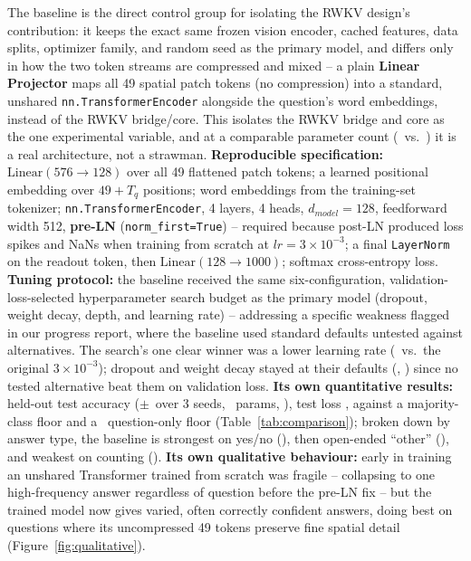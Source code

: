 \documentclass[final]{article}
\begin{document}
The baseline is the direct control group for isolating the RWKV design's contribution: it keeps
the exact same frozen vision encoder, cached features, data splits, optimizer family, and random
seed as the primary model, and differs only in how the two token streams are compressed and mixed
-- a plain \textbf{Linear Projector} maps all 49 spatial patch tokens (no compression) into a
standard, unshared \texttt{nn.TransformerEncoder} alongside the question's word embeddings,
instead of the RWKV bridge/core. This isolates the RWKV bridge and core as the one experimental
variable, and at a comparable parameter count (\baselineParams\ vs.\ \primaryParams) it is a real
architecture, not a strawman. \textbf{Reproducible specification:} $\mathrm{Linear}(576\to128)$
over all 49 flattened patch tokens; a learned positional embedding over $49+T_q$ positions; word
embeddings from the training-set tokenizer; \texttt{nn.TransformerEncoder}, 4 layers, 4 heads,
$d_{model}=128$, feedforward width 512, \textbf{pre-LN} (\texttt{norm\_first=True}) -- required
because post-LN produced loss spikes and NaNs when training from scratch at $lr=3\times10^{-3}$;
a final \texttt{LayerNorm} on the readout token, then $\mathrm{Linear}(128\to1000)$; softmax
cross-entropy loss. \textbf{Tuning protocol:} the baseline received the same six-configuration,
validation-loss-selected hyperparameter search budget as the primary model (dropout, weight decay,
depth, and learning rate) -- addressing a specific weakness flagged in our progress report, where
the baseline used standard defaults untested against alternatives. The search's one clear winner
was a lower learning rate (\baselineTunedLR\ vs.\ the original $3\times10^{-3}$); dropout and
weight decay stayed at their defaults (\baselineTunedDropout, \baselineTunedWeightDecay) since no
tested alternative beat them on validation loss.
\textbf{Its own quantitative results:} \textbf{\baselineTestAcc} held-out test accuracy
($\pm$\baselineTestAccStd\ over 3 seeds, \baselineParams\ params, \baselineSize), test loss
\baselineTestLoss, against a \textbf{\majorityFloor} majority-class floor and a \blindFloor\
question-only floor (Table~\ref{tab:comparison}); broken down by answer type, the baseline is
strongest on yes/no (\baselineAccYN), then open-ended ``other'' (\baselineAccOther), and weakest on
counting (\baselineAccNum). \textbf{Its own qualitative behaviour:} early in training an unshared
Transformer trained from scratch was fragile -- collapsing to one high-frequency answer regardless
of question before the pre-LN fix -- but the trained model now gives varied, often correctly
confident answers, doing best on questions where its uncompressed 49 tokens preserve fine spatial
detail (Figure~\ref{fig:qualitative}).
\end{document}

